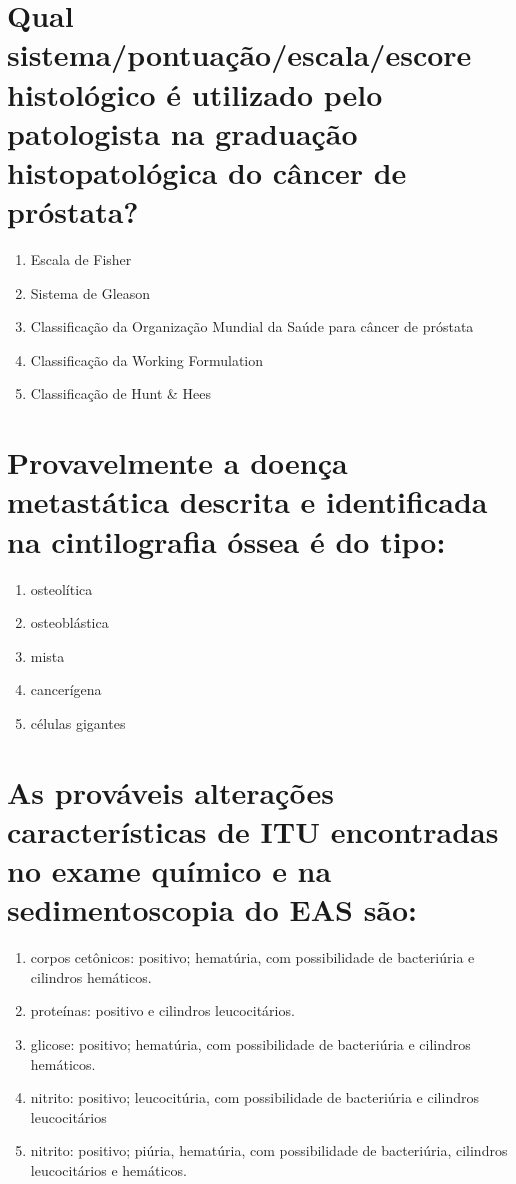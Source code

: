 \documentclass[11pt,notitlepage]{article}
\begin{document}
\section{Qual sistema/pontuação/escala/escore histológico é utilizado pelo patologista na graduação histopatológica do câncer de próstata?}
\begin{multicols}{2}
	\setlength{\columnseprule}{0pt}
	\begin{enumerate}[label=(\alph*)]
		\item Escala de Fisher
		\item Sistema de Gleason
		\item Classificação da Organização Mundial da Saúde para câncer de próstata
		\item Classificação da Working Formulation
		\item Classificação de Hunt \& Hees
	\end{enumerate}
\end{multicols}
\vspace{0.5cm}

\section{Provavelmente a doença metastática descrita e identificada na cintilografia óssea é do tipo:}
\begin{multicols}{2}
	\setlength{\columnseprule}{0pt}
	\begin{enumerate}[label=(\alph*)]
		\item osteolítica
		\item osteoblástica
		\item mista
		\item cancerígena
		\item células gigantes
	\end{enumerate}
\end{multicols}
\vspace{0.5cm}

\section{As prováveis alterações características de ITU encontradas no exame químico e na sedimentoscopia do EAS são:}
\begin{multicols}{2}
	\setlength{\columnseprule}{0pt}
	\begin{enumerate}[label=(\alph*)]
		\item corpos cetônicos: positivo; hematúria, com possibilidade de bacteriúria e cilindros hemáticos.
		\item proteínas: positivo e cilindros leucocitários.
		\item glicose: positivo; hematúria, com possibilidade de bacteriúria e cilindros hemáticos.
		\item nitrito: positivo; leucocitúria, com possibilidade de bacteriúria e cilindros leucocitários
		\item nitrito: positivo; piúria, hematúria, com possibilidade de bacteriúria, cilindros leucocitários e hemáticos.
	\end{enumerate}
\end{multicols}
\vspace{0.5cm}
\end{document}

